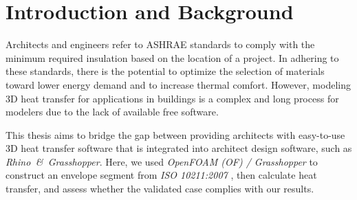 \chapter{Introduction and Background}
Architects and engineers refer to ASHRAE standards to comply with the minimum required insulation based on the location of a project. 
In adhering to these standards, there is the potential to optimize the selection of materials toward lower energy demand and to increase thermal comfort. 
However, modeling 3D heat transfer for applications in buildings is a complex and long process for modelers due to the lack of available free software. 

This thesis aims to bridge the gap between providing architects with easy-to-use 3D heat transfer software that is integrated into architect design software, such as \textit{Rhino\, \&\, Grasshopper}. Here, we used \textit{OpenFOAM (OF) / Grasshopper} to construct an envelope segment from \textit{ISO 10211:2007}
\cite{ISO}, then calculate heat transfer, and assess whether the validated case complies with our results. 




